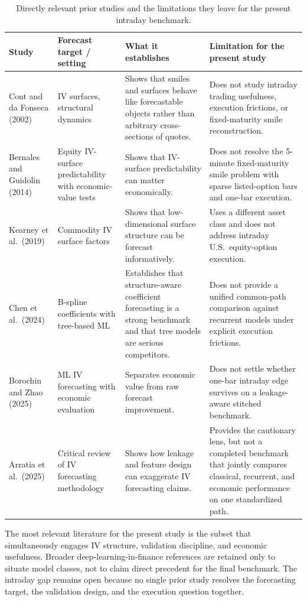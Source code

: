 \documentclass[12pt]{report}
\begin{document}
\begin{table}[H]
\centering
\caption{Directly relevant prior studies and the limitations they leave for the present intraday benchmark.}
\label{tab:literature_comparison}
\footnotesize
\renewcommand{\arraystretch}{1.15}
\begin{tabularx}{\textwidth}{@{}p{}p{}YY@{}}
\toprule
\textbf{Study} & \textbf{Forecast target / setting} & \textbf{What it establishes} & \textbf{Limitation for the present study} \\
\midrule
Cont and da Fonseca (2002) & IV surfaces, structural dynamics & Shows that smiles and surfaces behave like forecastable objects rather than arbitrary cross-sections of quotes. & Does not study intraday trading usefulness, execution frictions, or fixed-maturity smile reconstruction. \\
Bernales and Guidolin (2014) & Equity IV-surface predictability with economic-value tests & Shows that IV-surface predictability can matter economically. & Does not resolve the 5-minute fixed-maturity smile problem with sparse listed-option bars and one-bar execution. \\
Kearney et al.\ (2019) & Commodity IV surface factors & Shows that low-dimensional surface structure can be forecast informatively. & Uses a different asset class and does not address intraday U.S.\ equity-option execution. \\
Chen et al.\ (2024) & B-spline coefficients with tree-based ML & Establishes that structure-aware coefficient forecasting is a strong benchmark and that tree models are serious competitors. & Does not provide a unified common-path comparison against recurrent models under explicit execution frictions. \\
Borochin and Zhao (2025) & ML IV forecasting with economic evaluation & Separates economic value from raw forecast improvement. & Does not settle whether one-bar intraday edge survives on a leakage-aware stitched benchmark. \\
Arratia et al.\ (2025) & Critical review of IV forecasting methodology & Shows how leakage and feature design can exaggerate IV forecasting claims. & Provides the cautionary lens, but not a completed benchmark that jointly compares classical, recurrent, and economic performance on one standardized path. \\
\bottomrule
\end{tabularx}
\end{table}

The most relevant literature for the present study is the subset that simultaneously engages IV structure, validation discipline, and economic usefulness. Broader deep-learning-in-finance references are retained only to situate model classes, not to claim direct precedent for the final benchmark. The intraday gap remains open because no single prior study resolves the forecasting target, the validation design, and the execution question together.
\end{document}
